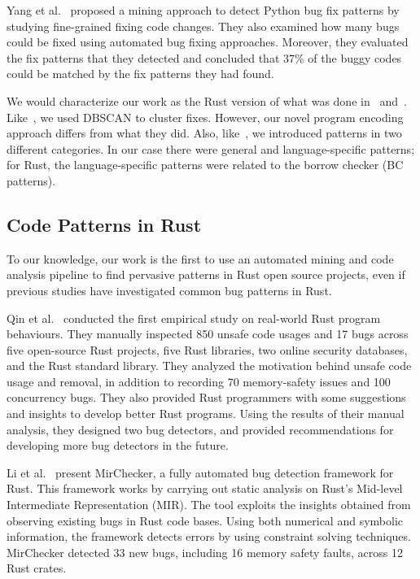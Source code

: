 Yang et al.~\cite{yang2022mining} proposed a mining approach to detect Python bug fix patterns by studying fine-grained fixing code changes. They also examined how many bugs could be fixed using automated bug fixing approaches. Moreover, they evaluated the fix patterns that they detected and concluded that 37\% of the buggy codes could be matched by the fix patterns they had found. 

We would characterize our work as the Rust version of what was done in~\cite{hanam2016discovering} and~\cite{yang2022mining}. Like~\cite{hanam2016discovering}, we used DBSCAN to cluster fixes. However, our novel program encoding approach differs from what they did. Also, like~\cite{yang2022mining}, we introduced patterns in two different categories. In our case there were general and language-specific patterns; for Rust, the language-specific patterns were related to the borrow checker (BC patterns).

\subsection{Code Patterns in Rust}

To our knowledge, our work is the first to use an automated mining and code analysis pipeline to find pervasive patterns in Rust open source projects, even if previous studies have investigated common bug patterns in Rust.

Qin et al.~\cite{qin2020understanding} conducted the first empirical study on real-world Rust program behaviours. They manually inspected 850 unsafe code usages and 17 bugs across five open-source Rust projects, five Rust libraries, two online security databases, and the Rust standard library. They analyzed the motivation behind unsafe code usage and removal, in addition to recording 70 memory-safety issues and 100 concurrency bugs. They also provided Rust programmers with some suggestions and insights to develop better Rust programs. Using the results of their manual analysis, they designed two bug detectors, and provided recommendations for developing more bug detectors in the future.

Li et al.~\cite{li2021mirchecker} present MirChecker, a fully automated bug detection framework for Rust. This framework works by carrying out static analysis on Rust's Mid-level Intermediate Representation (MIR). The tool exploits the insights obtained from observing existing bugs in Rust code bases. Using both numerical and symbolic information, the framework detects errors by using constraint solving techniques. MirChecker detected 33 new bugs, including 16 memory safety faults, across 12 Rust crates.

